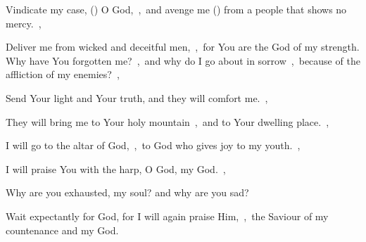 \documentclass[12pt,twoside,a5paper]{article}
\begin{document}
\begin{normalparskip}
  Vindicate my case, () O God,~\sep\ and avenge me () from a people that shows no mercy.~\sep


  Deliver me from wicked and deceitful men,~\sep\ for You are the God of my strength. Why have You forgotten me?~\sep\ and why do I go about in sorrow~\sep\ because of the affliction of my enemies?~\sep

  Send Your light and Your truth, and they will comfort me.~\sep

  They will bring me to Your holy mountain~\sep\ and to Your dwelling place.~\sep

  I will go to the altar of God,~\sep\ to God who gives joy to my youth.~\sep

  I will praise You with the harp, O God, my God.~\sep

  Why are you exhausted, my soul? and why are you sad?

  Wait expectantly for God, for I will again praise Him,~\sep\ the Saviour of my countenance and my God.
\end{normalparskip}



\end{document}
